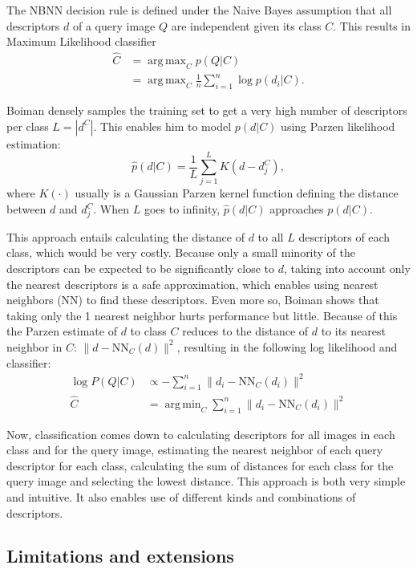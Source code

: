 \documentclass[a4paper,10pt]{article}
\DeclareMathOperator*{\argmax}{arg\,max}
\DeclareMathOperator*{\argmin}{arg\,min}
\begin{document}
The NBNN decision rule is defined under the Naive Bayes assumption that all descriptors $d$ of a query image $Q$ are independent given its class $C$. This results in Maximum Likelihood classifier 
\begin{align}
    \hat C &= \argmax_C p(Q|C)\\
           &= \argmax_C \frac{1}{n}\sum_{i=1}^{n} \log p(d_i|C).
\end{align}

Boiman densely samples the training set to get a very high number of descriptors per class $L = |d^C|$. This enables him to model $p(d|C)$ using Parzen likelihood estimation:
\begin{equation}
    \hat p(d|C) = \frac{1}{L}\sum_{j=1}^L K(d-d_j^C),
\end{equation}
where $K(\cdot)$ usually is a Gaussian Parzen kernel function defining the distance between $d$ and $d_j^C$. When $L$ goes to infinity, $\hat p(d|C)$ approaches $p(d|C)$.

This approach entails calculating the distance of $d$ to all $L$ descriptors of each class, which would be very costly. Because only a small minority of the descriptors can be expected to be significantly close to $d$, taking into account only the nearest descriptors is a safe approximation, which enables using nearest neighbors (NN) to find these descriptors. Even more so, Boiman shows that taking only the 1 nearest neighbor hurts performance but little. Because of this the Parzen estimate of $d$ to class $C$ reduces to the distance of $d$ to its nearest neighbor in $C$: $\|d - \text{NN}_C(d)\|^2$, resulting in the following log likelihood and classifier: 
\begin{align}
    \log P(Q|C) &\propto -\sum_{i=1}^n \|d_i - \text{NN}_C(d_i)\|^2 \\
    \hat C      &= \argmin_C \sum_{i=1}^n \|d_i - \text{NN}_C(d_i)\|^2
\end{align}

Now, classification comes down to calculating descriptors for all images in each class and for the query image, estimating the nearest neighbor of each query descriptor for each class, calculating the sum of distances for each class for the query image and selecting the lowest distance. This approach is both very simple and intuitive. It also enables use of different kinds and combinations of descriptors.

\subsection{Limitations and extensions} %
\label{sub:limitations_and_extensions}
\end{document}
